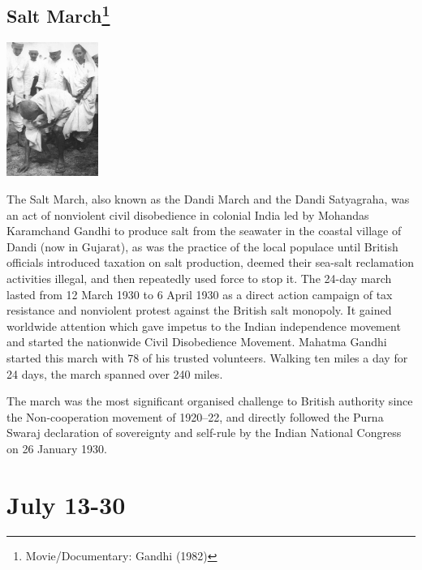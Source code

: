 \documentclass[11pt]{report}
\begin{document}
\subsection{Salt March\protect\footnote{Movie/Documentary: Gandhi (1982)}}
\vspace{2mm}\begin{center}\includegraphics[width=3cm]{./img/saltMarch.jpg}\end{center}
The Salt March, also known as the Dandi March and the Dandi Satyagraha, was an act of nonviolent civil disobedience in colonial India led by Mohandas Karamchand Gandhi to produce salt from the seawater in the coastal village of Dandi (now in Gujarat), as was the practice of the local populace until British officials introduced taxation on salt production, deemed their sea-salt reclamation activities illegal, and then repeatedly used force to stop it. The 24-day march lasted from 12 March 1930 to 6 April 1930 as a direct action campaign of tax resistance and nonviolent protest against the British salt monopoly. It gained worldwide attention which gave impetus to the Indian independence movement and started the nationwide Civil Disobedience Movement. Mahatma Gandhi started this march with 78 of his trusted volunteers. Walking ten miles a day for 24 days, the march spanned over 240 miles.

The march was the most significant organised challenge to British authority since the Non-cooperation movement of 1920–22, and directly followed the Purna Swaraj declaration of sovereignty and self-rule by the Indian National Congress on 26 January 1930.

\section{July 13-30}
\end{document}
